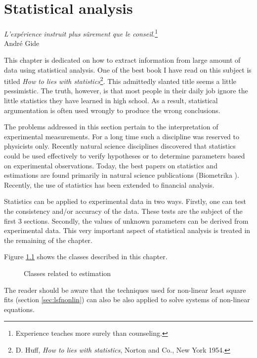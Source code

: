 \documentclass[twoside]{book}
\begin{document}
\fi

\chapter{Statistical analysis}
\label{ch:estimation}
\begin{flushright}
{\sl L'exp\'erience instruit plus s\^{u}rement que le
conseil.}\footnote{Experience teaches more surely than
counseling.}\\ Andr\'e Gide
\end{flushright}
\vspace{1 ex}This chapter is dedicated on how to extract
information from large amount of data using statistical analysis.
One of the best book I have read on this subject is titled {\sl
How to lies with statistics}\footnote{D. Huff, {\sl How to lies
with statistics}, Norton and Co., New York 1954.}. This admittedly
slanted title seems a little pessimistic. The truth, however, is
that most people in their daily job ignore the little statistics
they have learned in high school. As a result, statistical
argumentation is often used wrongly to produce the wrong
conclusions.

The problems addressed in this section pertain to the
interpretation of experimental measurements. For a long time such
a discipline was reserved to physicists only. Recently natural
science disciplines discovered that statistics could be used
effectively to verify hypotheses or to determine parameters based
on experimental observations. Today, the best papers on statistics
and estimations are found primarily in natural science
publications (Biometrika \eg). Recently, the use of statistics has
been extended to financial analysis.

Statistics can be applied to experimental data in two ways.
Firstly, one can test the consistency and/or accuracy of the data.
These tests are the subject of the first 3 sections. Secondly, the
values of unknown parameters can be derived from experimental
data. This very important aspect of statistical analysis is
treated in the remaining of the chapter.

Figure \ref{fig:estimationclasses} shows the classes described in
this chapter.
\begin{figure}
\center{}
\caption{Classes related to estimation}
\label{fig:estimationclasses}
\end{figure}
The reader should be aware that the techniques used for non-linear
least square fits (section \ref{sec:lsfnonlin}) can also be also
applied to solve systems of non-linear equations.
\end{document}
